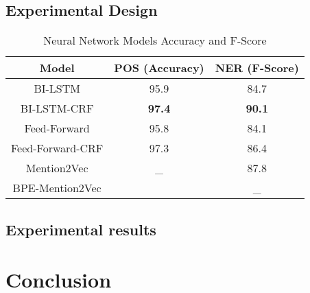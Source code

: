 \documentclass{sfuthesis}
\begin{document}
\section{Experimental Design}
\begin{table}[]
\centering
\caption{Neural Network Models Accuracy and F-Score}
\label{my-label}
\begin{tabular}{|c|c|c|}
\hline
Model         & POS (Accuracy)  & NER (F-Score)       \\ \hline
BI-LSTM  & 95.9     & 84.7                             \\ \hline
BI-LSTM-CRF & \textbf{97.4} & \textbf{90.1}                             \\ \hline
Feed-Forward    & 95.8          &   84.1                                         \\ \hline
Feed-Forward-CRF & 97.3     & 86.4                          \\ \hline
Mention2Vec & _    & 87.8                         \\ \hline
BPE-Mention2Vec  &     &  _   \\ \hline   
\end{tabular}
\end{table}


\section{Experimental results}


\chapter{Conclusion}


%
%
%
%
%

\cleardoublepage
{}
{}
%


	

\end{document}
